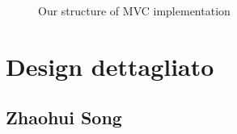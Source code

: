\documentclass[a4paper,12pt]{report}
\begin{document}
\begin{figure}[H]
    \centering{}
    \caption{Our structure of MVC implementation}
    \label{img:MVC}
    \end{figure}



\section{Design dettagliato}

\subsection{Zhaohui Song}
\end{document}
